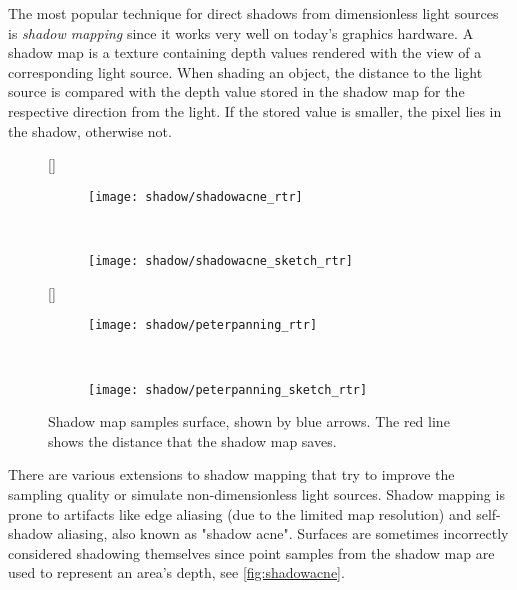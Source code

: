 \documentclass[thesis.tex]{subfiles}
\begin{document}
The most popular technique for direct shadows from dimensionless light sources is \emph{shadow mapping} \cite{bib:shadowmapping} since it works very well on today's graphics hardware.
A shadow map is a texture containing depth values rendered with the view of a corresponding light source.
When shading an object, the distance to the light source is compared with the depth value stored in the shadow map for the respective direction from the light.
If the stored value is smaller, the pixel lies in the shadow, otherwise not.


\begin{figure}[h]
\centering
{}[\textwidth]{
	\begin{subfigure}[b]{0.32\textwidth}
		\texttt{[image: shadow/shadowacne\_rtr]}
   	\end{subfigure}
   	~~~~
 	\begin{subfigure}[b]{0.4\textwidth}
	 	\texttt{[image: shadow/shadowacne\_sketch\_rtr]}
 	\end{subfigure}
}

\vspace{0.5cm}

[\textwidth]{
	\begin{subfigure}[b]{0.32\textwidth}
		\texttt{[image: shadow/peterpanning\_rtr]}
   	\end{subfigure}
   	~~~~
 	\begin{subfigure}[b]{0.4\textwidth}
	 	\texttt{[image: shadow/peterpanning\_sketch\_rtr]}
 	\end{subfigure}
}
\caption{\cite[p.351]{bib:RealtimeRenderingBook} Shadow map samples surface, shown by blue arrows. The red line shows the distance that the shadow map saves.}
\end{figure}
There are various extensions to shadow mapping that try to improve the sampling quality or simulate non-dimensionless light sources.
Shadow mapping is prone to artifacts like edge aliasing (due to the limited map resolution) and self-shadow aliasing, also known as "shadow acne".
Surfaces are sometimes incorrectly considered shadowing themselves since point samples from the shadow map are used to represent an area's depth, see \autoref{fig:shadowacne}.
\end{document}
